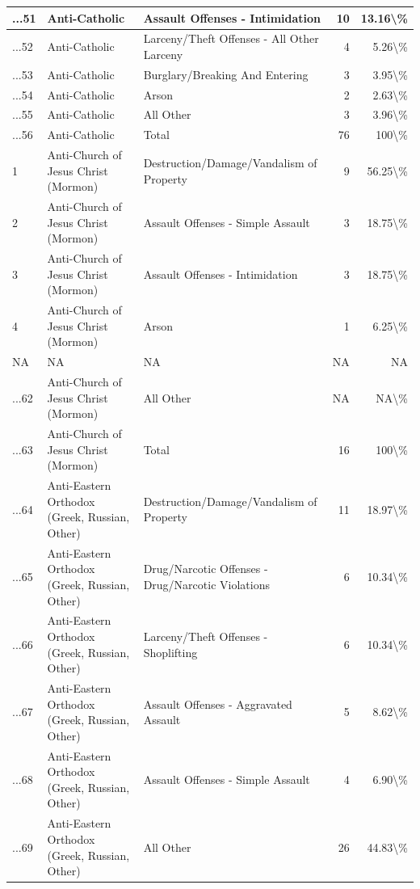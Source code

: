 \documentclass[
]{krantz}
\begin{document}
\begin{longtable}[t]{l|l|l|r|r}
\hline
...51 & Anti-Catholic & Assault Offenses - Intimidation & 10 & 13.16\textbackslash{}\%\\
\hline
...52 & Anti-Catholic & Larceny/Theft Offenses - All Other Larceny & 4 & 5.26\textbackslash{}\%\\
\hline
...53 & Anti-Catholic & Burglary/Breaking And Entering & 3 & 3.95\textbackslash{}\%\\
\hline
...54 & Anti-Catholic & Arson & 2 & 2.63\textbackslash{}\%\\
\hline
...55 & Anti-Catholic & All Other & 3 & 3.96\textbackslash{}\%\\
\hline
...56 & Anti-Catholic & Total & 76 & 100\textbackslash{}\%\\
\hline
1 & Anti-Church of Jesus Christ (Mormon) & Destruction/Damage/Vandalism of Property & 9 & 56.25\textbackslash{}\%\\
\hline
2 & Anti-Church of Jesus Christ (Mormon) & Assault Offenses - Simple Assault & 3 & 18.75\textbackslash{}\%\\
\hline
3 & Anti-Church of Jesus Christ (Mormon) & Assault Offenses - Intimidation & 3 & 18.75\textbackslash{}\%\\
\hline
4 & Anti-Church of Jesus Christ (Mormon) & Arson & 1 & 6.25\textbackslash{}\%\\
\hline
NA & NA & NA & NA & NA\\
\hline
...62 & Anti-Church of Jesus Christ (Mormon) & All Other & NA & NA\textbackslash{}\%\\
\hline
...63 & Anti-Church of Jesus Christ (Mormon) & Total & 16 & 100\textbackslash{}\%\\
\hline
...64 & Anti-Eastern Orthodox (Greek, Russian, Other) & Destruction/Damage/Vandalism of Property & 11 & 18.97\textbackslash{}\%\\
\hline
...65 & Anti-Eastern Orthodox (Greek, Russian, Other) & Drug/Narcotic Offenses - Drug/Narcotic Violations & 6 & 10.34\textbackslash{}\%\\
\hline
...66 & Anti-Eastern Orthodox (Greek, Russian, Other) & Larceny/Theft Offenses - Shoplifting & 6 & 10.34\textbackslash{}\%\\
\hline
...67 & Anti-Eastern Orthodox (Greek, Russian, Other) & Assault Offenses - Aggravated Assault & 5 & 8.62\textbackslash{}\%\\
\hline
...68 & Anti-Eastern Orthodox (Greek, Russian, Other) & Assault Offenses - Simple Assault & 4 & 6.90\textbackslash{}\%\\
\hline
...69 & Anti-Eastern Orthodox (Greek, Russian, Other) & All Other & 26 & 44.83\textbackslash{}\%\\

\end{longtable}
\end{document}
